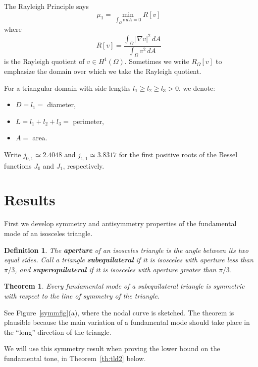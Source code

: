 \documentclass[11pt,reqno]{amsart}
\newtheorem{theorem}{Theorem}[section]
\newtheorem*{definition}{Definition}
\numberwithin{equation}{section}
\begin{document}
The Rayleigh Principle says
\[
\mu_1 = \min_{\int_\Omega v \, dA = 0} R[v]
\]
where 
\[
R[v] = \frac{\int_\Omega |\nabla v|^2 \, dA}{\int_\Omega v^2 \, dA}
\]
is the Rayleigh quotient of $v \in H^1(\Omega)$. Sometimes we write $R_\Omega[v]$ to emphasize the domain over which we take the Rayleigh quotient.

For a triangular domain with side lengths $l_1 \ge l_2 \ge l_3 > 0$, we denote:
\begin{itemize}
  \item[] $D=l_1 =$ diameter,
  \item[] $L=l_1 + l_2 + l_3 =$ perimeter,
  \item[] $A=$ area.
  \end{itemize}
Write $j_{0,1} \simeq 2.4048$ and $j_{1,1} \simeq 3.8317$ for the first positive roots of the Bessel functions $J_0$ and $J_1$, respectively.

\section{\bf Results}

First we develop symmetry and antisymmetry properties of
the fundamental mode of an isosceles triangle. 
\begin{definition}\rm
The \textbf{aperture} of an isosceles triangle is the angle between
its two equal sides. Call a triangle \textbf{subequilateral} if it is isosceles with
aperture less than $\pi/3$, and \textbf{superequilateral} if it is
isosceles with aperture greater than $\pi/3$.
\end{definition}
\begin{theorem} \label{sharpsymmetric} Every fundamental mode of a subequilateral triangle is symmetric
with respect to the line of symmetry of the triangle.
\end{theorem}
See Figure~\ref{symmfig}(a), where the nodal curve is sketched. The theorem is plausible because the main variation of a fundamental mode should take place in the ``long'' direction of the triangle.

We will use this symmetry result when proving the lower bound on the fundamental tone, in Theorem~\ref{th:tld2} below. 
\end{document}
